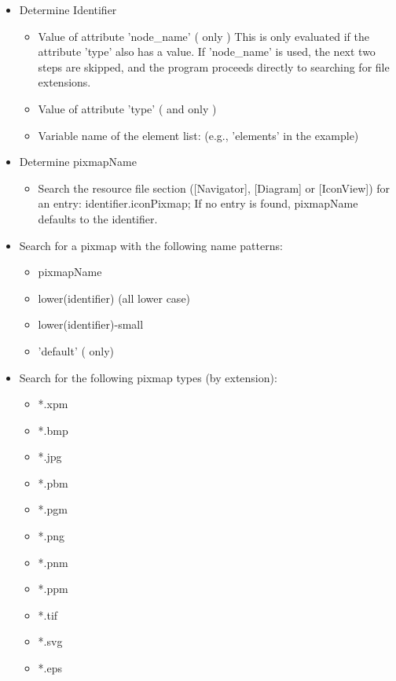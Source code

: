 \begin{itemize}
\item Determine Identifier
  \begin{itemize}
  \item Value of \STRING{} attribute 'node\_name' ( \DIAGRAM{} only ) \newline
  This is only evaluated if the \STRING{} attribute 'type' also has a value.
  If 'node\_name' is used, the next two steps are skipped,
  and the program proceeds directly to searching for file extensions.
  \item Value of \STRING{} attribute 'type' ( \DIAGRAM{} and \ICONVIEW{} only )
  \item Variable name of the element list: \newline
  (e.g., 'elements' in the \ICONVIEW{} example)
  \end{itemize}

\item Determine pixmapName
  \begin{itemize}
  \item Search the resource file section ([Navigator], [Diagram] or [IconView])
        for an entry: identifier.iconPixmap; \newline
        If no entry is found, pixmapName defaults to the identifier.
  \end{itemize}

\item Search for a pixmap with the following name patterns:
  \begin{itemize}
  \item pixmapName
  \item lower(identifier) (all lower case)
  \item lower(identifier)-small
  \item 'default' (\DIAGRAM{} only)
  \end{itemize}

\item Search for the following pixmap types (by extension):
  \begin{itemize}
  \item *.xpm
  \item *.bmp
  \item *.jpg
  \item *.pbm
  \item *.pgm
  \item *.png
  \item *.pnm
  \item *.ppm
  \item *.tif
  \item *.svg
  \item *.eps
  \end{itemize}


\end{itemize}
